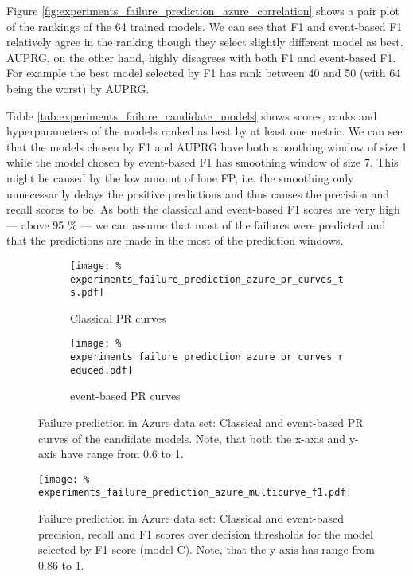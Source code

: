 Figure \ref{fig:experiments_failure_prediction_azure_correlation} shows a pair plot of the rankings of the 64 trained models.
We can see that F1 and event-based F1 relatively agree in the ranking though they select slightly different model as best.
AUPRG, on the other hand, highly disagrees with both F1 and event-based F1.
For example the best model selected by F1 has rank between 40 and 50 (with 64 being the worst) by AUPRG.

Table \ref{tab:experiments_failure_candidate_models} shows scores, ranks and hyperparameters of the models ranked as best by at least one metric.
We can see that the models chosen by F1 and AUPRG have both smoothing window of size 1 while the model chosen by event-based F1 has smoothing window of size 7.
This might be caused by the low amount of lone FP, i.e. the smoothing only unnecessarily delays the positive predictions and thus causes the precision and recall scores to be.
As both the classical and event-based F1 scores are very high --- above 95 \% --- we can assume that most of the failures were predicted and that the predictions are made in the most of the prediction windows.

\begin{figure}
    \centering
    \begin{subfigure}{.85\textwidth}
        \texttt{[image: \%
            experiments\_failure\_prediction\_azure\_pr\_curves\_ts.pdf]}
        \caption{Classical PR curves}
    \end{subfigure}
    \begin{subfigure}{.85\textwidth}
        \texttt{[image: \%
            experiments\_failure\_prediction\_azure\_pr\_curves\_reduced.pdf]}
        \caption{event-based PR curves}
    \end{subfigure}
    \caption{Failure prediction in Azure data set: Classical and event-based PR curves of the candidate models. Note, that both the x-axis and y-axis have range from 0.6 to 1.}
    \label{fig:experiments_failure_prediction_azure_pr}
\end{figure}

\begin{figure}
    \centering
        \texttt{[image: \%
            experiments\_failure\_prediction\_azure\_multicurve\_f1.pdf]}
    \caption{Failure prediction in Azure data set: Classical and event-based precision, recall and F1 scores over decision thresholds for the model selected by F1 score (model C). Note, that the y-axis has range from 0.86 to 1.}
    \label{fig:experiments_failure_prediction_azure_multicurve}
\end{figure}

